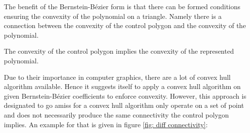 The benefit of the Bernstein-B\'ezier form is that there can be formed conditions ensuring the convexity of the polynomial on a triangle. Namely there is a connection between the convexity of the control polygon and the convexity of the polynomial.
\begin{theorem}
	The convexity of the control polygon implies the convexity of the represented polynomial.
\end{theorem}
Due to their importance in computer graphics, there are a lot of convex hull algorithm available. Hence it suggests itself to apply a convex hull algorithm on given Bernstein-B\'ezier coefficients to enforce convexity. However, this approach is designated to go amiss for a convex hull algorithm only operate on a set of point and does not necessarily produce the same connectivity the control polygon implies. An example for that is given in figure \ref{fig: diff connectivity}:
